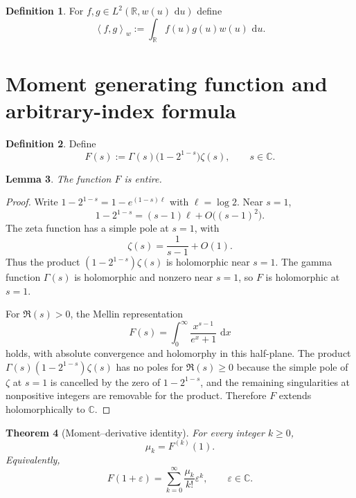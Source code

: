 \documentclass[11pt]{amsart}
\numberwithin{equation}{section}
\newtheorem{theorem}{Theorem}[section]
\newtheorem{lemma}[theorem]{Lemma}
\theoremstyle{definition}
\newtheorem{definition}[theorem]{Definition}
\newcommand{\R}{\mathbb{R}}
\newcommand{\C}{\mathbb{C}}
\newcommand{\dd}{\,\mathrm{d}}
\newcommand{\mom}[1]{\mu_{#1}}
\newcommand{\inner}[2]{\left\langle #1,#2\right\rangle_{w}}
\begin{document}
\begin{definition}\label{def:inner}
For $f,g\in L^{2}(\R,w(u)\,\dd u)$ define
\begin{equation}\label{eq:inner}
\inner{f}{g}:=\int_{\R}f(u)g(u)w(u)\,\dd u.
\end{equation}
\end{definition}

\section{Moment generating function and arbitrary-index formula}

\begin{definition}\label{def:F}
Define
\begin{equation}\label{eq:F}
F(s):=\Gamma(s)\bigl(1-2^{1-s}\bigr)\zeta(s),\qquad s\in\C.
\end{equation}
\end{definition}

\begin{lemma}\label{lem:F-entire}
The function $F$ is entire.
\end{lemma}

\begin{proof}
Write $1-2^{1-s}=1-e^{(1-s)\ell}$ with $\ell=\log 2$. Near $s=1$,
\[
1-2^{1-s}=(s-1)\ell+O\bigl((s-1)^{2}\bigr).
\]
The zeta function has a simple pole at $s=1$, with
\[
\zeta(s)=\frac{1}{s-1}+O(1).
\]
Thus the product $(1-2^{1-s})\zeta(s)$ is holomorphic near $s=1$. The gamma
function $\Gamma(s)$ is holomorphic and nonzero near $s=1$, so $F$ is
holomorphic at $s=1$.

For $\Re(s)>0$, the Mellin representation
\begin{equation}\label{eq:Mellin-F}
F(s)=\int_{0}^{\infty}\frac{x^{s-1}}{e^{x}+1}\,\dd x
\end{equation}
holds, with absolute convergence and holomorphy in this half-plane. The
product $\Gamma(s)(1-2^{1-s})\zeta(s)$ has no poles for $\Re(s)\ge 0$ because
the simple pole of $\zeta$ at $s=1$ is cancelled by the zero of $1-2^{1-s}$,
and the remaining singularities at nonpositive integers are removable for the
product. Therefore $F$ extends holomorphically to $\C$.
\end{proof}

\begin{theorem}[Moment--derivative identity]\label{thm:moment-derivative}
For every integer $k\ge 0$,
\begin{equation}\label{eq:moment-derivative}
\mom{k}=F^{(k)}(1).
\end{equation}
Equivalently,
\begin{equation}\label{eq:egf}
F(1+\varepsilon)
=\sum_{k=0}^{\infty}\frac{\mom{k}}{k!}\varepsilon^{k},
\qquad\varepsilon\in\C.
\end{equation}
\end{theorem}
\end{document}
